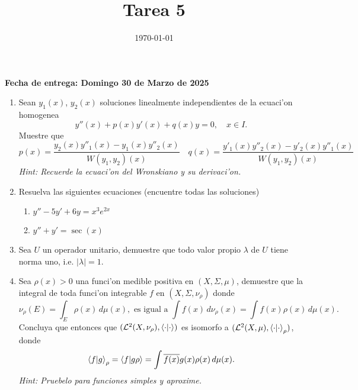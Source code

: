 \documentclass[letterpaper]{article}
\date{\today}
\title{Tarea 5}
\newcommand{\sig}{\ensuremath{\Sigma}}
\begin{document}
\maketitle

\textbf{Fecha de entrega: Domingo 30 de Marzo de 2025}

\begin{enumerate}
  \item Sean $y_{1}(x)$, $y_{2}(x)$ soluciones linealmente independientes de la ecuaci'on homogenea
        \[
            y''(x)+p(x)y'(x)+q(x)y=0,\quad x\in I.
        \]
        Muestre que
        \[
        p(x)=\frac{y_{2}(x)y''_{1}(x)-y_{1}(x)y''_{2}(x)}{W(y_{1},y_{2})(x)}\quad q(x)=\frac{y'_{1}(x)y''_{2}(x)-y'_{2}(x)y''_{1}(x)}{W(y_{1},y_{2})(x)}
        \]
\noindent\emph{Hint: Recuerde la ecuaci'on del Wronskiano y su derivaci'on.}
  \item Resuelva las siguientes ecuaciones (encuentre todas las soluciones)
        \begin{enumerate}
          \item $y''-5y'+6y=x^{3}e^{2x}$
          \item $y''+y'=\sec(x)$
        \end{enumerate}

  \item Sea \(U\) un operador unitario, demuestre que todo valor propio $\lambda$ de \(U\) tiene norma uno, i.e. $|\lambda|=1$.
  \item Sea $\rho(x)>0$ una funci'on medible positiva en $(X,\sig,\mu)$, demuestre que la integral de toda funci'on integrable $f$ en $(X,\sig,\nu_{\rho})$ donde
        \[
        \nu_{\rho}(E)=\int_{E}\rho(x)\,d\mu(x),\text{ es igual a }\int f(x)\,d\nu_{\rho}(x)=\int f(x)\rho(x)\,d\mu(x).
        \]
        Concluya que entonces que \((\mathcal{L}^{2}(X,\nu_{\rho}),\braket{\cdot|\cdot})\) es isomorfo a \((\mathcal{L}^{2}(X,\mu),\braket{\cdot|\cdot}_{\rho})\), donde
        \[
        \braket{f|g}_{\rho}=\braket{f|g\rho}=\int\overline{f(x)}g(x)\rho(x)\,d\mu(x).
        \]
\noindent\emph{Hint: Pruebelo para funciones simples y aproxime.}
\end{enumerate}
\end{document}
